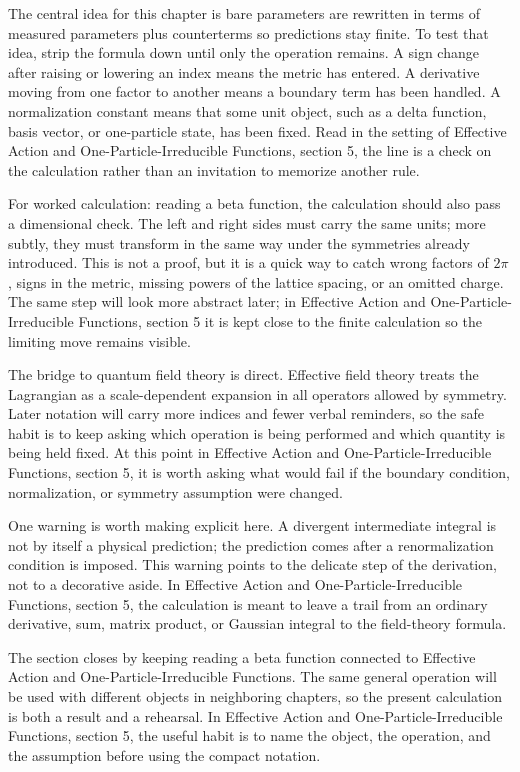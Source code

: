 The central idea for this chapter is bare parameters are rewritten in terms of measured parameters plus counterterms so predictions stay finite.  To test that idea, strip the formula down until only the operation remains.  A sign change after raising or lowering an index means the metric has entered.  A derivative moving from one factor to another means a boundary term has been handled.  A normalization constant means that some unit object, such as a delta function, basis vector, or one-particle state, has been fixed.  Read in the setting of Effective Action and One-Particle-Irreducible Functions, section 5, the line is a check on the calculation rather than an invitation to memorize another rule.

For worked calculation: reading a beta function, the calculation should also pass a dimensional check.  The left and right sides must carry the same units; more subtly, they must transform in the same way under the symmetries already introduced.  This is not a proof, but it is a quick way to catch wrong factors of \(2\pi\), signs in the metric, missing powers of the lattice spacing, or an omitted charge.  The same step will look more abstract later; in Effective Action and One-Particle-Irreducible Functions, section 5 it is kept close to the finite calculation so the limiting move remains visible.

The bridge to quantum field theory is direct.  Effective field theory treats the Lagrangian as a scale-dependent expansion in all operators allowed by symmetry.  Later notation will carry more indices and fewer verbal reminders, so the safe habit is to keep asking which operation is being performed and which quantity is being held fixed.  At this point in Effective Action and One-Particle-Irreducible Functions, section 5, it is worth asking what would fail if the boundary condition, normalization, or symmetry assumption were changed.

One warning is worth making explicit here.  A divergent intermediate integral is not by itself a physical prediction; the prediction comes after a renormalization condition is imposed.  This warning points to the delicate step of the derivation, not to a decorative aside.  In Effective Action and One-Particle-Irreducible Functions, section 5, the calculation is meant to leave a trail from an ordinary derivative, sum, matrix product, or Gaussian integral to the field-theory formula.

The section closes by keeping reading a beta function connected to Effective Action and One-Particle-Irreducible Functions.  The same general operation will be used with different objects in neighboring chapters, so the present calculation is both a result and a rehearsal.  In Effective Action and One-Particle-Irreducible Functions, section 5, the useful habit is to name the object, the operation, and the assumption before using the compact notation.



